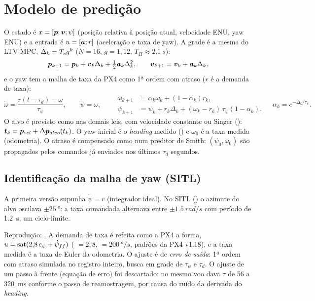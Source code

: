 \section{Modelo de predição}
O estado é $x=[\bm{p};\bm{v};\psi]$ (posição relativa à posição atual, velocidade ENU, yaw ENU)
e a entrada é $u=[\bm{a};r]$ (aceleração e taxa de yaw). A grade é a mesma do LTV-MPC,
$\Delta_k=T_s g^k$ ($N=16$, $g=1{,}12$, $T_H\approx\SI{2,1}{s}$):
\begin{equation}
  \bm{p}_{k+1}=\bm{p}_k+\bm{v}_k\Delta_k+\tfrac12\bm{a}_k\Delta_k^2,\qquad
  \bm{v}_{k+1}=\bm{v}_k+\bm{a}_k\Delta_k,
\end{equation}
e o yaw tem a malha de taxa da PX4 como 1ª ordem com atraso ($r$ é a demanda de taxa):
\begin{equation}
  \dot\omega=\frac{r(t-\tau_d)-\omega}{\tau_\psi},\qquad\dot\psi=\omega,
  \qquad
  \begin{aligned}
    \omega_{k+1}&=\alpha_k\omega_k+(1-\alpha_k)r_k,\\
    \psi_{k+1}&=\psi_k+r_k\Delta_k+(\omega_k-r_k)\,\tau_\psi(1-\alpha_k),
  \end{aligned}
  \quad \alpha_k=e^{-\Delta_k/\tau_\psi}.
\end{equation}
O alvo é previsto como nas demais leis, com velocidade constante ou Singer
(): $\bm{t}_k=\bm{p}_{rel}+\Delta\bm{p}_{alvo}(t_k)$.
O yaw inicial é o \emph{heading} medido () e $\omega_0$ é a taxa
medida (odometria). O atraso é compensado como num preditor de Smith: $(\psi_0,\omega_0)$ são
propagados pelos comandos já enviados nos últimos $\tau_d$ segundos.

\subsection{Identificação da malha de yaw (SITL)}
\label{sec:ibvs_yaw_id}
A primeira versão supunha $\dot\psi=r$ (integrador ideal). No SITL () o azimute
do alvo oscilava $\pm\SI{25}{\degree}$: a taxa comandada alternava entre $\pm\SI{1,5}{rad/s}$ com
período de \SI{1,2}{s}, um ciclo-limite.

Reprodução: . A demanda de taxa é refeita como
a PX4 a forma, $u=\operatorname{sat}(2{,}8\,e_\psi+\dot\psi_{ff})$ ( $=2{,}8$,
 $=\SI{200}{\degree/s}$, padrões da PX4 v1.18), e a taxa medida é a taxa de
Euler da odometria. O ajuste é de \emph{erro de saída}: 1ª ordem com atraso simulada no registro
inteiro, busca em grade de $\tau_\psi$ e $\tau_d$. O ajuste de um passo à frente (equação de erro)
foi descartado: no mesmo voo dava $\tau$ de 56 a \SI{320}{ms} conforme o passo de reamostragem, por
causa do ruído da derivada do \emph{heading}.

